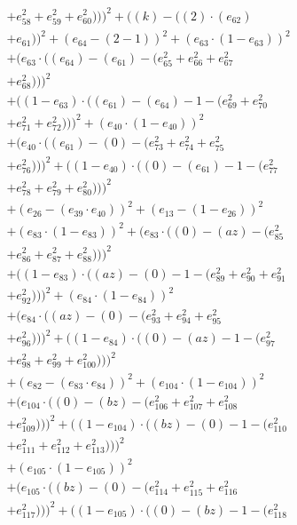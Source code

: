 \documentclass[10pt, a4paper]{article}
\begin{document}
\begin{align*}
& + e_{58}^{2} + e_{59}^{2} + e_{60}^{2})))^{2} + ((k) - ((2)  \cdot  (e_{62}) \\
& + e_{61}))^{2} + (e_{64} - (2 - 1))^{2} + (e_{63}  \cdot  (1 - e_{63}))^{2} \\
& + (e_{63}  \cdot  ((e_{64}) - (e_{61}) - (e_{65}^{2} + e_{66}^{2} + e_{67}^{2} \\
& + e_{68}^{2})))^{2} \\
& + ((1 - e_{63})  \cdot  ((e_{61}) - (e_{64}) - 1 - (e_{69}^{2} + e_{70}^{2} \\
& + e_{71}^{2} + e_{72}^{2})))^{2} + (e_{40}  \cdot  (1 - e_{40}))^{2} \\
& + (e_{40}  \cdot  ((e_{61}) - (0) - (e_{73}^{2} + e_{74}^{2} + e_{75}^{2} \\
& + e_{76}^{2})))^{2} + ((1 - e_{40})  \cdot  ((0) - (e_{61}) - 1 - (e_{77}^{2} \\
& + e_{78}^{2} + e_{79}^{2} + e_{80}^{2})))^{2} \\
& + (e_{26} - (e_{39}  \cdot  e_{40}))^{2} + (e_{13} - (1 - e_{26}))^{2} \\
& + (e_{83}  \cdot  (1 - e_{83}))^{2} + (e_{83}  \cdot  ((0) - (az) - (e_{85}^{2} \\
& + e_{86}^{2} + e_{87}^{2} + e_{88}^{2})))^{2} \\
& + ((1 - e_{83})  \cdot  ((az) - (0) - 1 - (e_{89}^{2} + e_{90}^{2} + e_{91}^{2} \\
& + e_{92}^{2})))^{2} + (e_{84}  \cdot  (1 - e_{84}))^{2} \\
& + (e_{84}  \cdot  ((az) - (0) - (e_{93}^{2} + e_{94}^{2} + e_{95}^{2} \\
& + e_{96}^{2})))^{2} + ((1 - e_{84})  \cdot  ((0) - (az) - 1 - (e_{97}^{2} \\
& + e_{98}^{2} + e_{99}^{2} + e_{100}^{2})))^{2} \\
& + (e_{82} - (e_{83}  \cdot  e_{84}))^{2} + (e_{104}  \cdot  (1 - e_{104}))^{2} \\
& + (e_{104}  \cdot  ((0) - (bz) - (e_{106}^{2} + e_{107}^{2} + e_{108}^{2} \\
& + e_{109}^{2})))^{2} + ((1 - e_{104})  \cdot  ((bz) - (0) - 1 - (e_{110}^{2} \\
& + e_{111}^{2} + e_{112}^{2} + e_{113}^{2})))^{2} \\
& + (e_{105}  \cdot  (1 - e_{105}))^{2} \\
& + (e_{105}  \cdot  ((bz) - (0) - (e_{114}^{2} + e_{115}^{2} + e_{116}^{2} \\
& + e_{117}^{2})))^{2} + ((1 - e_{105})  \cdot  ((0) - (bz) - 1 - (e_{118}^{2} \\

\end{align*}
\end{document}
